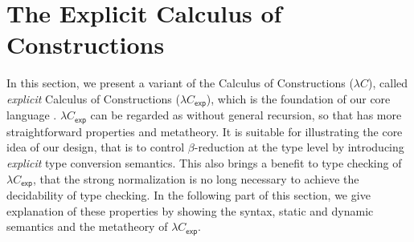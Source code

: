 \section{The Explicit Calculus of Constructions}
\label{sec:formal}




\newcommand{\expcc}{$\lambda C_{\mathsf{exp}}$\xspace}
\newcommand{\cc}{$\lambda C$\xspace}
\newcommand{\gram}[1]{\ottgrammartabular{#1\ottafterlastrule}}
\newcommand{\ruleref}[1]{\ottdrulename{#1}}

\renewcommand{\ottpremise}[1]{\enskip #1 \enskip}

In this section, we present a variant of the Calculus of Constructions (\cc), called \emph{explicit} Calculus of Constructions (\expcc), which is the foundation of our core language \name. \expcc can be regarded as \name without general recursion, so that has more straightforward properties and metatheory. It is suitable for illustrating the core idea of our design, that is to control $\beta$-reduction at the type level by introducing \emph{explicit} type conversion semantics. This also brings a benefit to type checking of \expcc, that the strong normalization is no long necessary to achieve the decidability of type checking. In the following part of this section, we give explanation of these properties by showing the syntax, static and dynamic semantics and the metatheory of \expcc.

